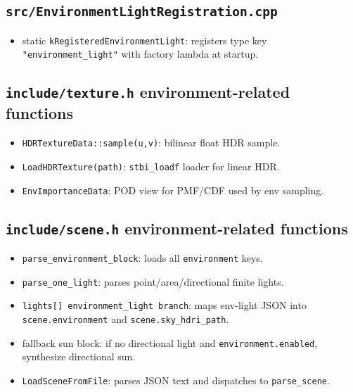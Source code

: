 \documentclass[11pt]{article}
\begin{document}
\subsection{\texttt{src/EnvironmentLightRegistration.cpp}}
\begin{itemize}[leftmargin=1.5em]
  \item static \verb|kRegisteredEnvironmentLight|: registers type key \verb|"environment_light"| with factory lambda at startup.
\end{itemize}

\subsection{\texttt{include/texture.h} environment-related functions}
\begin{itemize}[leftmargin=1.5em]
  \item \verb|HDRTextureData::sample(u,v)|: bilinear float HDR sample.
  \item \verb|LoadHDRTexture(path)|: \verb|stbi_loadf| loader for linear HDR.
  \item \verb|EnvImportanceData|: POD view for PMF/CDF used by env sampling.
\end{itemize}

\subsection{\texttt{include/scene.h} environment-related functions}
\begin{itemize}[leftmargin=1.5em]
  \item \verb|parse_environment_block|: loads all \verb|environment| keys.
  \item \verb|parse_one_light|: parses point/area/directional finite lights.
  \item \verb|lights[] environment_light branch|: maps env-light JSON into \verb|scene.environment| and \verb|scene.sky_hdri_path|.
  \item fallback sun block: if no directional light and \verb|environment.enabled|, synthesize directional sun.
  \item \verb|LoadSceneFromFile|: parses JSON text and dispatches to \verb|parse_scene|.
\end{itemize}
\end{document}
